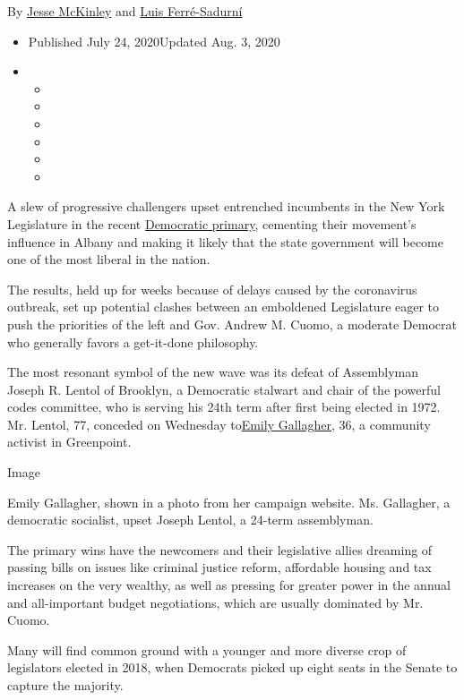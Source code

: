 By \href{https://www.nytimes.com/by/jesse-mckinley}{Jesse McKinley} and
\href{https://www.nytimes.com/by/luis-ferre-sadurni}{Luis Ferré-Sadurní}

\begin{itemize}
\item
  Published July 24, 2020Updated Aug. 3, 2020
\item
  \begin{itemize}
  \item
  \item
  \item
  \item
  \item
  \item
  \end{itemize}
\end{itemize}

A slew of progressive challengers upset entrenched incumbents in the New
York Legislature in the recent
\href{https://www.nytimes.com/2020/08/03/nyregion/nyc-mail-ballots-voting.html}{Democratic
primary}, cementing their movement's influence in Albany and making it
likely that the state government will become one of the most liberal in
the nation.

The results, held up for weeks because of delays caused by the
coronavirus outbreak, set up potential clashes between an emboldened
Legislature eager to push the priorities of the left and Gov. Andrew M.
Cuomo, a moderate Democrat who generally favors a get-it-done
philosophy.

The most resonant symbol of the new wave was its defeat of Assemblyman
Joseph R. Lentol of Brooklyn, a Democratic stalwart and chair of the
powerful codes committee, who is serving his 24th term after first being
elected in 1972. Mr. Lentol, 77, conceded on Wednesday
to\href{https://www.emilyforassembly.com/}{Emily Gallagher}, 36, a
community activist in Greenpoint.

Image

Emily Gallagher, shown in a photo from her campaign website. Ms.
Gallagher, a democratic socialist, upset Joseph Lentol, a 24-term
assemblyman.

The primary wins have the newcomers and their legislative allies
dreaming of passing bills on issues like criminal justice reform,
affordable housing and tax increases on the very wealthy, as well as
pressing for greater power in the annual and all-important budget
negotiations, which are usually dominated by Mr. Cuomo.

Many will find common ground with a younger and more diverse crop of
legislators elected in 2018, when Democrats picked up eight seats in the
Senate to capture the majority.

